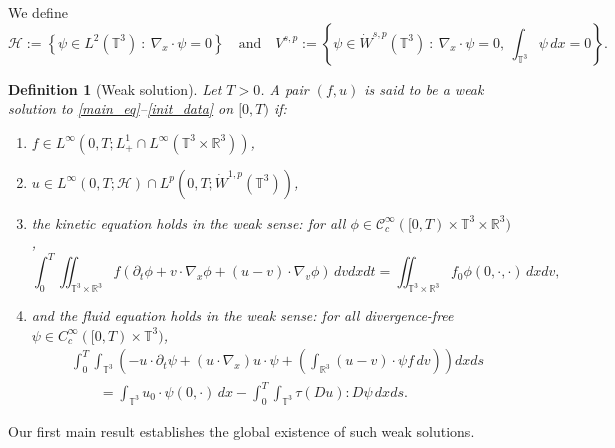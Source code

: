 \documentclass[10pt,reqno]{amsart}
\numberwithin{equation}{section}
\newtheorem{definition}{Definition}[section]
\newcommand{\R}{\mathbb R}
\newcommand{\T}{\mathbb T}
\newcommand{\pa}{\partial}
\newcommand{\intt}{\int_{\T^3}}
\newcommand{\intr}{\int_{\R^3}}
\newcommand{\inttr}{\iint_{\T^3 \times \R^3}}
\begin{document}
We define
\[
\mathcal{H} := \left\{ \psi \in L^2(\T^3)\ :\ \nabla_x \cdot \psi = 0 \right\} \quad \mbox{and} \quad
V^{s,p} := \left\{ \psi \in \dot{W}^{s,p}(\T^3)\ : \ \nabla_x \cdot \psi = 0,\ \int_{\T^3} \psi\,dx = 0 \right\}.
\]

\begin{definition}[Weak solution]\label{def_weak}
Let $T > 0$. A pair $(f,u)$ is said to be a weak solution to \eqref{main_eq}--\eqref{init_data} on $[0,T)$ if:
\begin{enumerate}
\item $f \in L^\infty(0,T; L^1_+ \cap L^\infty(\T^3 \times \R^3))$,
\item $u \in L^\infty(0,T; \mathcal{H}) \cap L^p(0,T; \dot{W}^{1,p}(\T^3))$,
\item the kinetic equation holds in the weak sense: for all $\phi \in \mathcal{C}_c^\infty([0,T)\times \T^3 \times \R^3)$,
\[
\int_0^T \!\!\inttr f(\pa_t \phi + v \cdot \nabla_x \phi + (u-v)\cdot \nabla_v  \phi)\,dvdxdt = \inttr f_0 \phi(0,\cdot,\cdot)\,dxdv,
\]
\item and the fluid equation holds in the weak sense: for all divergence-free $\psi \in C_c^\infty([0,T)\times\T^3)$,
\begin{align*}
&\int_0^T \intt \left(-u \cdot \pa_t \psi +  (u\cdot \nabla_x )u \cdot \psi  + \left(\intr (u-v)\cdot \psi f\,dv\right)\right)dxds \\
&\qquad=  \intt u_0 \cdot \psi(0,\cdot)\,dx - \int_0^T \intt \tau(Du) : D\psi \,dxds.
\end{align*}

\end{enumerate}
\end{definition}

Our first main result establishes the global existence of such weak solutions.
\end{document}

